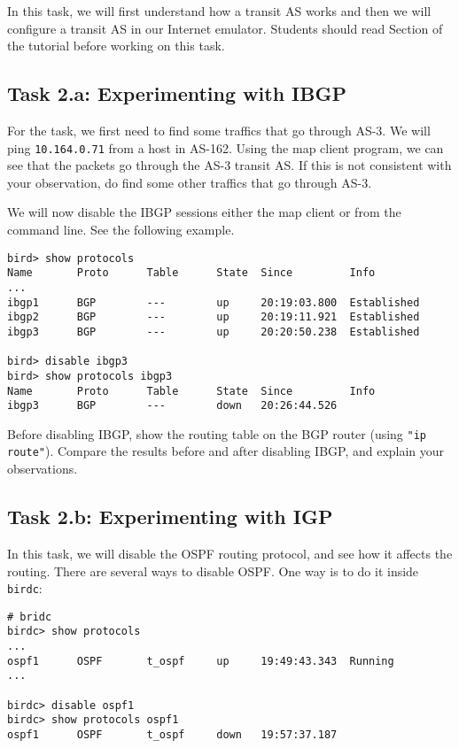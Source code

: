 In this task, we will first understand how a transit AS works and
then we will configure a transit AS in our Internet emulator. 
Students should read Section \transitas of the tutorial before working on this task.

\subsection{Task 2.a: Experimenting with IBGP} 


For the task, we first need to find some traffics that 
go through AS-3. We will ping \texttt{10.164.0.71} from a host in AS-162. Using the 
map client program, we can see that the packets go through
the AS-3 transit AS. If this is not consistent with your observation,
do find some other traffics that go through AS-3. 

We will now disable the IBGP sessions either the map client or 
from the command line. See the following example.

\begin{lstlisting}
bird> show protocols
Name       Proto      Table      State  Since         Info
...
ibgp1      BGP        ---        up     20:19:03.800  Established
ibgp2      BGP        ---        up     20:19:11.921  Established
ibgp3      BGP        ---        up     20:20:50.238  Established

bird> disable ibgp3 
bird> show protocols ibgp3
Name       Proto      Table      State  Since         Info
ibgp3      BGP        ---        down   20:26:44.526
\end{lstlisting}
 
Before disabling IBGP, show the routing table 
on the BGP router (using \texttt{"ip route"}). Compare the 
results before and after disabling IBGP, and explain
your observations. 


\subsection{Task 2.b: Experimenting with IGP} 

In this task, we will disable the OSPF routing protocol, and see 
how it affects the routing. There are several ways to disable
OSPF. One way is to do it inside \texttt{birdc}: 

\begin{lstlisting}
# bridc
birdc> show protocols
...
ospf1      OSPF       t_ospf     up     19:49:43.343  Running
...

birdc> disable ospf1
birdc> show protocols ospf1
ospf1      OSPF       t_ospf     down   19:57:37.187
\end{lstlisting}
 

